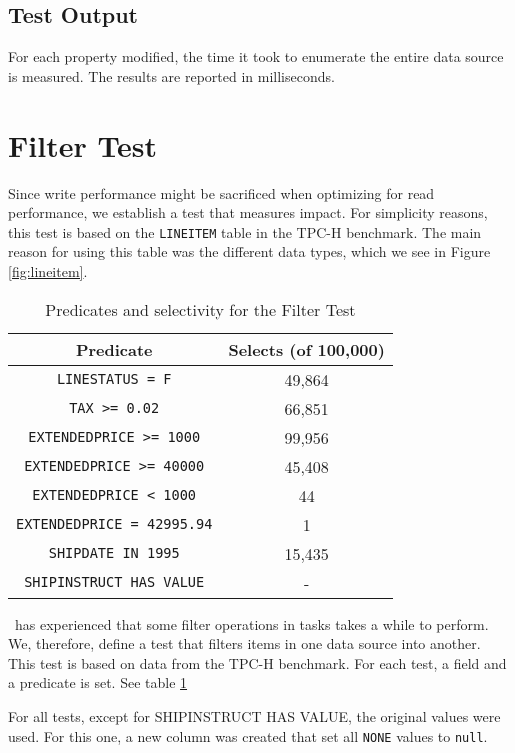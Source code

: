 \subsection{Test Output}
\label{sub:Test Output}
For each property modified, the time it took to enumerate the entire data source is measured. The results are reported in milliseconds.

\section{Filter Test}
\label{sec:Filter Test}


Since write performance might be sacrificed when optimizing for read performance, we establish a test that measures impact. For simplicity reasons, this test is based on the \texttt{LINEITEM} table in the TPC-H benchmark. The main reason for using this table was the different data types, which we see in Figure \ref{fig:lineitem}.
\begin{table}
    \begin{tabular}{c | c}
        Predicate & Selects (of 100,000) \\
        \hline
        \hline
        \texttt{LINESTATUS = F} & 49,864 \\
        \texttt{TAX >= 0.02} & 66,851 \\
        \texttt{EXTENDEDPRICE >= 1000} & 99,956 \\
        \texttt{EXTENDEDPRICE >= 40000} & 45,408\\
        \texttt{EXTENDEDPRICE < 1000} & 44 \\
        \texttt{EXTENDEDPRICE = 42995.94} & 1 \\
        \texttt{SHIPDATE IN 1995} & 15,435 \\
        \texttt{SHIPINSTRUCT HAS VALUE} & - \\
    \end{tabular}
    \caption{Predicates and selectivity for the Filter Test}
    \label{tab:Filter Test}
\end{table}
\genus~has experienced that some filter operations in tasks takes a while to perform. We, therefore, define a test that filters items in one data source into another. This test is based on data from the TPC-H benchmark. For each test, a field and a predicate is set. See table \ref{tab:Filter Test}

For all tests, except for SHIPINSTRUCT HAS VALUE, the original values were used. For this one, a new column was created that set all \texttt{NONE} values to \texttt{null}.

